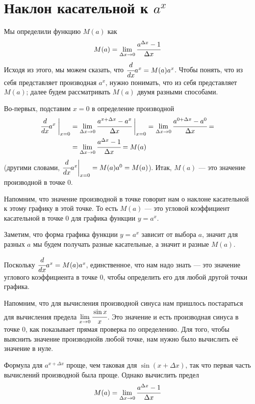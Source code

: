 ﻿\documentclass[a4paper,12pt, 3in, 4in]{article}
\begin{document}
    \section*{Наклон касательной к $a^x$}
    Мы определили функцию $M(a)$ как
    \[
        M(a) = \lim\limits_{\Delta x \to 0} \cfrac{a^{\Delta x} - 1}{\Delta x}
    \]
    Исходя из этого, мы можем сказать, что $\cfrac{d}{dx}a^x = M(a)a^x$. Чтобы понять, что из себя представляет производная $a^x$, нужно понимать, что из себя представляет $M(a)$; далее будем рассматривать $M(a)$ двумя разными способами. \par
    Во-первых, подставим $x = 0$ в определение производной
    \begin{align*}
        \cfrac{d}{dx} a^x \;\biggr{|}_{x=0} &= \lim\limits_{\Delta x \to 0} \cfrac{a^{x + \Delta x} -a^x}{\Delta x}\;\biggr{|}_{x=0} =  \lim\limits_{\Delta x \to 0} \cfrac{a^{0+\Delta x} - a^0}{\Delta x}= \\ &= \lim\limits_{\Delta x \to 0} \cfrac{a^{\Delta x} - 1}{\Delta x} = M(a)
    \end{align*}
    (другими словами, $\cfrac{d}{dx} a^x\biggr{|}_{x = 0} = M(a)a^0 = M(a)$). Итак, $M(a)$ --- это значение производной в точке $0$. \par
    Напомним, что значение производной в точке говорит нам о наклоне касательной к этому графику в этой точке. То есть $M(a)$ --- это угловой коэффициент касательной в точке 0 для графика функции $y = a^x$. \par
    Заметим, что форма графика функции $y = a^x$ зависит от выбора $a$, значит для разных $a$ мы будем получать разные касательные, а значит и разные $M(a)$. \par
    Поскольку $\cfrac{d}{dx}a^x = M(a)a^x$, единственное, что нам надо знать --- это значение углового коэффициента в точке 0, чтобы определить его для любой другой точки графика. \par
    Напомним, что для вычисления производной синуса нам пришлось постараться для вычисления предела $\lim\limits_{x \to 0} \cfrac{\sin x}{x}$. Это значение и есть производная синуса в точке 0, как показывает прямая проверка по определению. Для того, чтобы выяснить значение производнойв любой точке, нам нужно было вычислить её значение в нуле.\par
    Формула для $a^{x+\Delta x}$ проще, чем таковая для $\sin(x + \Delta x)$, так что первая часть вычислений производной была проще. Однако вычислить предел
    \[
    M(a) = \lim\limits_{\Delta x \to 0}\cfrac{a^{\Delta x} - 1}{\Delta x}
    \]
\end{document}
